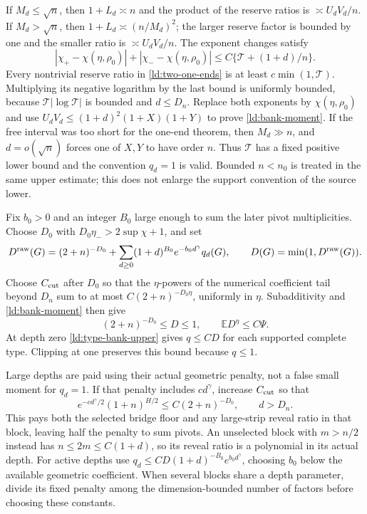 If \(M_d\le\sqrt n\), then \(1+L_d\asymp n\) and the product
of the reserve ratios is \(\asymp U_dV_d/n\).  If
\(M_d>\sqrt n\), then \(1+L_d\asymp(n/M_d)^2\); the larger
reserve factor is bounded by one and the smaller ratio is
\(\asymp U_dV_d/n\).  The exponent changes satisfy
\[
 |\chi_+-\chi(\eta,\rho_0)|+
 |\chi_--\chi(\eta,\rho_0)|
       \le C\{\mathcal T+(1+d)/n\}.
\]
Every nontrivial reserve ratio in \eqref{ld:two-one-ends} is at least
\(c\min(1,\mathcal T)\).  Multiplying its negative logarithm by
the last bound is uniformly bounded, because
\(\mathcal T|\log\mathcal T|\) is bounded and \(d\le D_n\).
Replace both exponents by \(\chi(\eta,\rho_0)\) and use
\(U_dV_d\le(1+d)^2(1+X)(1+Y)\) to prove
\eqref{ld:bank-moment}.  If the free interval was too short for the
one-end theorem, then \(M_d\gg n\), and \(d=o(\sqrt n)\)
forces one of \(X,Y\) to have order \(n\).  Thus \(\mathcal T\)
has a fixed positive lower bound and the convention \(q_d=1\) is
valid.  Bounded \(n<n_0\) is treated in the same upper estimate;
this does not enlarge the support convention of the source lower.

Fix \(b_0>0\) and an integer \(B_0\) large enough to sum the
later pivot multiplicities.  Choose \(D_0\) with
\(D_0\eta_->2\sup\chi+1\), and set
\begin{equation}
 D^{\rm raw}(G)=(2+n)^{-D_0}
       +\sum_{d\ge0}(1+d)^{B_0}e^{-b_0d^\gamma}q_d(G),
 \qquad D(G)=\min(1,D^{\rm raw}(G)).
 \label{ld:cost-envelope}
\end{equation}
Choose \(C_{\rm cut}\) after \(D_0\) so that the \(\eta\)-powers
of the numerical coefficient tail beyond \(D_n\) sum to at most
\(C(2+n)^{-D_0\eta}\), uniformly in \(\eta\).
Subadditivity and \eqref{ld:bank-moment} then give
\begin{equation}
 (2+n)^{-D_0}\le D\le1,\qquad
 \mathbb E D^\eta\le C\Psi.
 \label{ld:cost-moment}
\end{equation}
At depth zero \eqref{ld:type-bank-upper} gives \(q\le CD\) for
each supported complete type.  Clipping at one preserves this bound
because \(q\le1\).

Large depths are paid using their actual geometric penalty, not a
false small moment for \(q_d=1\).  If that penalty includes
\(cd^\gamma\), increase \(C_{\rm cut}\) so that
\begin{equation}
 e^{-cd^\gamma/2}(1+n)^{H/2}\le C(2+n)^{-D_0},
       \qquad d>D_n.
 \label{ld:large-depth}
\end{equation}
This pays both the selected bridge floor and any large-strip reveal
ratio in that block, leaving half the penalty to sum pivots.  An
unselected block with \(m>n/2\) instead has
\(n\le2m\le C(1+d)\), so its reveal ratio is a polynomial in
its actual depth.  For active depths use
\(q_d\le CD(1+d)^{-B_0}e^{b_0d^\gamma}\), choosing \(b_0\)
below the available geometric coefficient.  When several blocks
share a depth parameter, divide its fixed penalty among the
dimension-bounded number of factors before choosing these constants.

